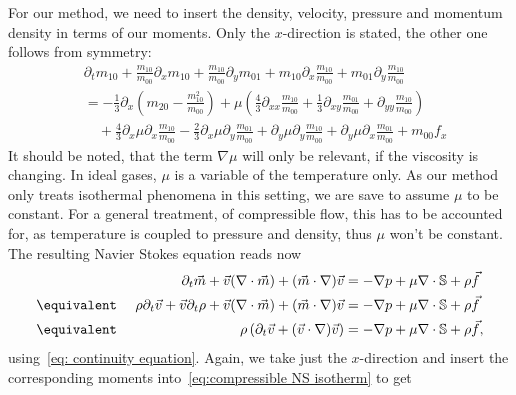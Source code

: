 For our method, we need to insert the density, velocity, pressure and momentum density in terms of our moments.
Only the $x$-direction is stated, the other one follows from symmetry:
\begin{equation}
  \begin{aligned}
    & \partial_t m_{10}
    + \frac{m_{10}}{m_{00}} \partial_x m_{10}
    + \frac{m_{10}}{m_{00}}\partial_y m_{01}
    + m_{10} \partial_x \frac{m_{10}}{m_{00}}
    + m_{01} \partial_y \frac{m_{10}}{m_{00}}
    \\
    & =
     - \frac{1}{3} \partial_x \left(m_{20} - \frac{ m_{10}^2 }{ m_{00} } \right)
     + \mu \left(\frac{4}{3}\partial_{xx}\frac{m_{10}}{m_{00}}
            + \frac{1}{3}\partial_{xy} \frac{m_{01}}{m_{00}}
            + \partial_{yy} \frac{m_{10}}{m_{00}} \right) \\
    &\quad + \frac{4}{3}\partial_x \mu \partial_x \frac{m_{10}}{m_{00}}
    - \frac{2}{3}\partial_x \mu \partial_y \frac{m_{01}}{m_{00}}
    + \partial_y \mu \partial_y \frac{m_{10}}{m_{00}}
    + \partial_y \mu \partial_x \frac{m_{01}}{m_{00}}
    + m_{00}f_x
  \end{aligned}
\end{equation}
It should be noted, that the term $\nabla \mu$ will only be relevant, if the viscosity is changing.
In ideal gases, $\mu$ is a variable of the temperature only.
As our method only treats isothermal phenomena in this setting, we are save to assume $\mu$ to be constant.
For a general treatment, of compressible flow, this has to be accounted for, as temperature is coupled to pressure and density, thus $\mu$ won't be constant.
The resulting Navier Stokes equation reads now
\begin{alignat}{3}
  \label{eq:compressible NS isotherm}
  &&\partial_t \vec{m} + \vec{v}(\nabla \cdot \vec{m}) + (\vec{m} \cdot \nabla)\vec{v}
    &= - \nabla p + \mu \nabla \cdot \mathbb{S} + \rho \vec{f}\\
  \nonumber
  &\equivalent\ & \rho\partial_t \vec{v} + \vec{v}\partial_t \rho + \vec{v}(\nabla \cdot \vec{m}) + (\vec{m} \cdot \nabla)\vec{v}
    &= - \nabla p + \mu \nabla \cdot \mathbb{S} + \rho \vec{f}\\
  \label{eq:compressible NS isotherm reduced}
  &\equivalent& \rho\left(\partial_t \vec{v} + (\vec{v} \cdot \nabla)\vec{v}\right)
    &= - \nabla p + \mu \nabla \cdot \mathbb{S} + \rho \vec{f},
\end{alignat}
using~\eqref{eq: continuity equation}.
Again, we take just the $x$-direction and insert the corresponding moments into~\eqref{eq:compressible NS isotherm} to get
